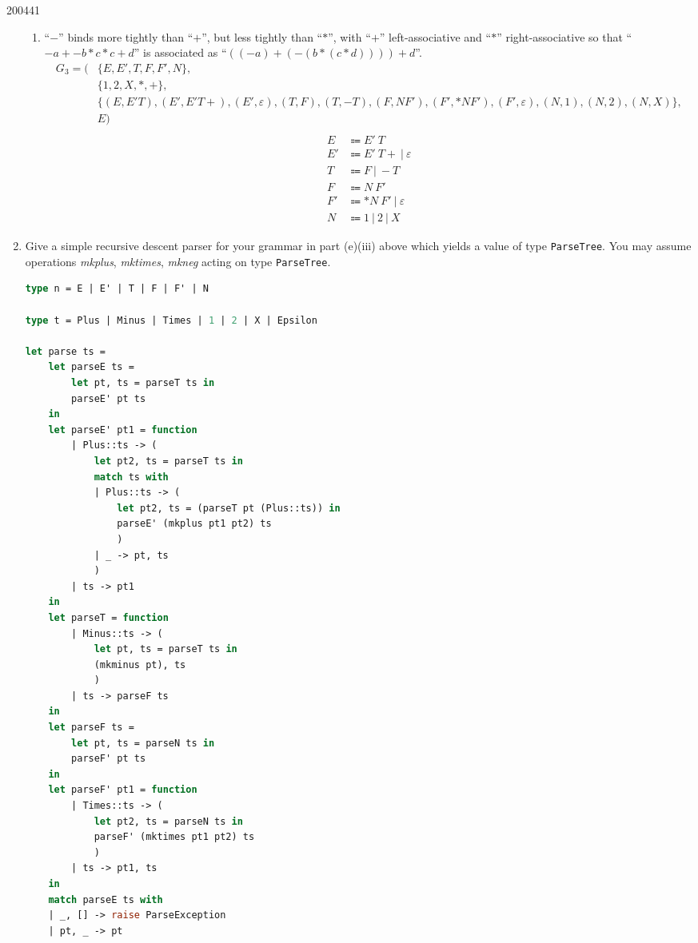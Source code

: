 \documentclass[10pt,\jkfside,a4paper]{article}
\begin{document}
\begin{examquestion}{2004}{4}{1}
\begin{enumerate}
\begin{enumerate}
\item ``$-$'' binds more tightly than ``$+$'', but less tightly than
``$*$'', with ``$+$'' left-associative and ``$*$'' right-associative so that
``$-a + -b * c * c + d$'' is associated as ``$((-a) + (-(b * (c * d)))) + d$''.
\[
\begin{split}
G_3 = (&\{E, E', T, F, F', N\}, \\
	   &\{1, 2, X, *, +\}, \\
	   &\{(E, E'T), (E', E'T+), (E',\varepsilon), (T, F), (T, -T), (F, NF'),
	    (F', *NF'), (F', \varepsilon), (N, 1), (N, 2), (N, X)\}, \\
	   &E) \\
\end{split}
\]
\begin{align*}
E &\Coloneqq E'\ T \\
E'&\Coloneqq E' \ T + \ | \ \varepsilon \\
T &\Coloneqq F \ | \ -T \\
F &\Coloneqq N \ F' \\
F' &\Coloneqq *N \ F' \ | \ \varepsilon \\
N &\Coloneqq 1 \ | \ 2 \ | \ X
\end{align*}

\end{enumerate}

\item Give a simple recursive descent parser for your grammar in part (e)(iii)
above which yields a value of type \texttt{ParseTree}. You may assume
operations \textit{mkplus}, \textit{mktimes}, \textit{mkneg} acting on type
\texttt{ParseTree}.

\begin{lstlisting}[language=Caml]
type n = E | E' | T | F | F' | N

type t = Plus | Minus | Times | 1 | 2 | X | Epsilon

let parse ts =
	let parseE ts =
		let pt, ts = parseT ts in
		parseE' pt ts
	in
	let parseE' pt1 = function
		| Plus::ts -> (
			let pt2, ts = parseT ts in
			match ts with
			| Plus::ts -> (
				let pt2, ts = (parseT pt (Plus::ts)) in
				parseE' (mkplus pt1 pt2) ts
				)
			| _ -> pt, ts
			)
		| ts -> pt1
	in
	let parseT = function
		| Minus::ts -> (
			let pt, ts = parseT ts in
			(mkminus pt), ts
			)
		| ts -> parseF ts
	in
	let parseF ts =
		let pt, ts = parseN ts in
		parseF' pt ts
	in
	let parseF' pt1 = function
		| Times::ts -> (
			let pt2, ts = parseN ts in
			parseF' (mktimes pt1 pt2) ts
			)
		| ts -> pt1, ts
	in
	match parseE ts with
	| _, [] -> raise ParseException
	| pt, _ -> pt
\end{lstlisting}


\end{enumerate}
\end{examquestion}
\end{document}
